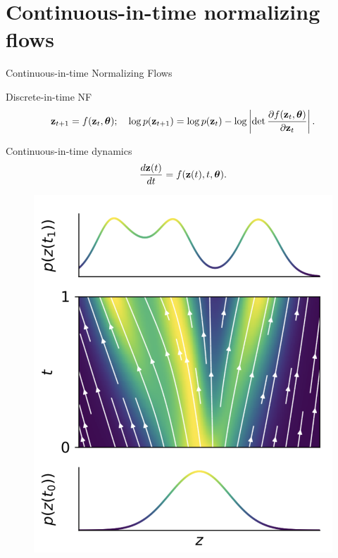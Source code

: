 \section{Continuous-in-time normalizing flows}
\begin{frame}{Continuous-in-time Normalizing Flows}
	\vspace{-0.3cm}
	\begin{block}{Discrete-in-time NF}
		\vspace{-0.8cm}
		  \[
		  \mathbf{z}_{t+1} = f(\mathbf{z}_t, \boldsymbol{\theta}); \quad \log p(\mathbf{z}_{t+1}) = \log p(\mathbf{z}_{t}) - \log \left| \det \frac{\partial f(\mathbf{z}_t, \boldsymbol{\theta})}{\partial \mathbf{z}_{t}} \right| .
		  \]
		\vspace{-0.7cm}
	\end{block}
	\begin{block}{Continuous-in-time dynamics}
		\vspace{-0.2cm}
		\[
			\frac{d\mathbf{z}(t)}{dt} = f(\mathbf{z}(t), t, \boldsymbol{\theta}).
		\]
	\end{block}
	\vspace{-0.6cm}
	\begin{minipage}[t]{0.4\columnwidth}
		\begin{figure}
			\centering
			\includegraphics[width=0.75\linewidth]{figs/cnf_flow.png}
		\end{figure}
	\end{minipage}%
	\begin{minipage}[t]{0.6\columnwidth}
		\begin{figure}

\end{figure}
\end{minipage}
\end{frame}
